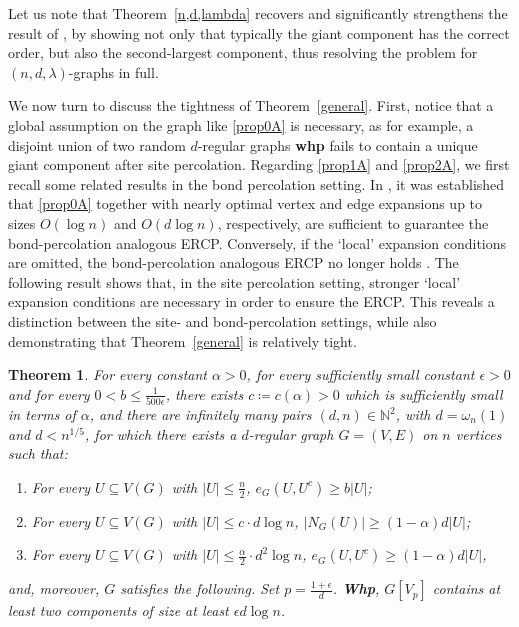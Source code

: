 \documentclass[notitlepage]{scrartcl}
\newtheorem{theorem}{Theorem}
\begin{document}
Let us note that Theorem~\ref{n,d,lambda} recovers and significantly strengthens the result of \cite{zbMATH07751060}, by showing not only that typically the giant component has the correct order, but also the second-largest component, thus resolving the problem for $(n,d,\lambda)$-graphs in full.

We now turn to discuss the tightness of Theorem~\ref{general}. First, notice that a global assumption on the graph like \ref{prop0A} is necessary, as for example, a disjoint union of two random $d$-regular graphs \textbf{whp} fails to contain a unique giant component after site percolation. Regarding \ref{prop1A} and \ref{prop2A}, we first recall some related results in the bond percolation setting. In \cite{zbMATH08098276,diskin2025componentslargesmalli}, it was established that \ref{prop0A} together with nearly optimal vertex and edge expansions up to sizes $O(\log n)$ and $O(d\log n)$, respectively, are sufficient to guarantee the bond-percolation analogous ERCP.  Conversely, if the `local' expansion conditions are omitted, the bond-percolation analogous ERCP no longer holds \cite[Theorem 3]{diskin2024percolationisoperimetry}. The following result shows that, in the site percolation setting, stronger `local' expansion conditions are necessary in order to ensure the ERCP. This reveals a distinction between the site- and bond-percolation settings, while also demonstrating that Theorem~\ref{general} is relatively tight. 

\begin{theorem} \label{no_second}
     For every constant $\alpha>0$, for every sufficiently small constant $\epsilon>0$ and for every $0<b\le \frac{1}{500\epsilon}$, there exists $c\coloneqq c(\alpha)>0$ which is sufficiently small in terms of $\alpha$, and there are infinitely many pairs $(d,n)\in\mathbb{N}^2$, with $d=\omega_n(1)$ and $d<n^{1/5}$, for which there exists a $d$-regular graph $G=(V,E)$ on $n$ vertices such that:
    \begin{enumerate}[(Q\arabic*{})]
        \item For every $U\subseteq V(G)$ with $|U|\leq \frac{n}{2}$, $e_G(U,U^c)\geq b|U|$; \label{prop0B}
        \item For every $U\subseteq V(G)$ with $|U|\leq c\cdot d\log n$, $|N_G(U)|\ge \left(1-\alpha\right)d|U|$; \label{prop1B}
        \item For every $U\subseteq V(G)$ with $|U|\leq \frac{\alpha}{2}\cdot d^2\log n$, $e_G(U,U^c)\ge \left(1-\alpha\right)d|U|$, \label{prop2B}
    \end{enumerate}
    and, moreover, $G$ satisfies the following. Set $p=\frac{1+\epsilon}{d}$. \textbf{Whp}, $G[V_p]$ contains at least two components of size at least $\epsilon d\log n$.
\end{theorem}
\end{document}
